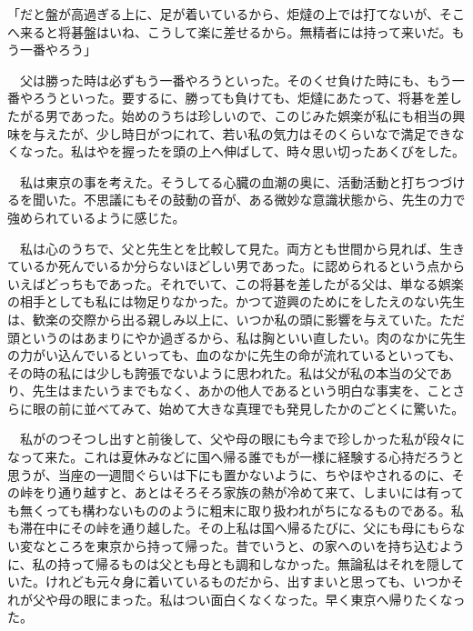 \documentclass[a4j,onecolumn]{tarticle}
\begin{document}
「だと盤が高過ぎる上に、\hbox{}足が着いているから、\hbox{}炬燵の上では打てないが、\hbox{}そこへ来ると将碁盤はいね、\hbox{}こうして楽に差せるから。\hbox{}無精者には持って来いだ。\hbox{}もう一番やろう」\par{}
　父は勝った時は必ずもう一番やろうといった。\hbox{}そのくせ負けた時にも、\hbox{}もう一番やろうといった。\hbox{}要するに、\hbox{}勝っても負けても、\hbox{}炬燵にあたって、\hbox{}将碁を差したがる男であった。\hbox{}始めのうちは珍しいので、\hbox{}このじみた娯楽が私にも相当の興味を与えたが、\hbox{}少し時日がつにれて、\hbox{}若い私の気力はそのくらいなで満足できなくなった。\hbox{}私はやを握ったを頭の上へ伸ばして、\hbox{}時々思い切ったあくびをした。\hbox{}\par{}
　私は東京の事を考えた。\hbox{}そうしてる心臓の血潮の奥に、\hbox{}活動活動と打ちつづけるを聞いた。\hbox{}不思議にもその鼓動の音が、\hbox{}ある微妙な意識状態から、\hbox{}先生の力で強められているように感じた。\hbox{}\par{}
　私は心のうちで、\hbox{}父と先生とを比較して見た。\hbox{}両方とも世間から見れば、\hbox{}生きているか死んでいるか分らないほどしい男であった。\hbox{}に認められるという点からいえばどっちもであった。\hbox{}それでいて、\hbox{}この将碁を差したがる父は、\hbox{}単なる娯楽の相手としても私には物足りなかった。\hbox{}かつて遊興のためにをしたえのない先生は、\hbox{}歓楽の交際から出る親しみ以上に、\hbox{}いつか私の頭に影響を与えていた。\hbox{}ただ頭というのはあまりにやか過ぎるから、\hbox{}私は胸といい直したい。\hbox{}肉のなかに先生の力がい込んでいるといっても、\hbox{}血のなかに先生の命が流れているといっても、\hbox{}その時の私には少しも誇張でないように思われた。\hbox{}私は父が私の本当の父であり、\hbox{}先生はまたいうまでもなく、\hbox{}あかの他人であるという明白な事実を、\hbox{}ことさらに眼の前に並べてみて、\hbox{}始めて大きな真理でも発見したかのごとくに驚いた。\hbox{}\par{}
　私がのつそつし出すと前後して、\hbox{}父や母の眼にも今まで珍しかった私が段々になって来た。\hbox{}これは夏休みなどに国へ帰る誰でもが一様に経験する心持だろうと思うが、\hbox{}当座の一週間ぐらいは下にも置かないように、\hbox{}ちやほやされるのに、\hbox{}その峠をり通り越すと、\hbox{}あとはそろそろ家族の熱が冷めて来て、\hbox{}しまいには有っても無くっても構わないもののように粗末に取り扱われがちになるものである。\hbox{}私も滞在中にその峠を通り越した。\hbox{}その上私は国へ帰るたびに、\hbox{}父にも母にもらない変なところを東京から持って帰った。\hbox{}昔でいうと、\hbox{}の家へのいを持ち込むように、\hbox{}私の持って帰るものは父とも母とも調和しなかった。\hbox{}無論私はそれを隠していた。\hbox{}けれども元々身に着いているものだから、\hbox{}出すまいと思っても、\hbox{}いつかそれが父や母の眼にまった。\hbox{}私はつい面白くなくなった。\hbox{}早く東京へ帰りたくなった。\hbox{}\par{}
\end{document}
